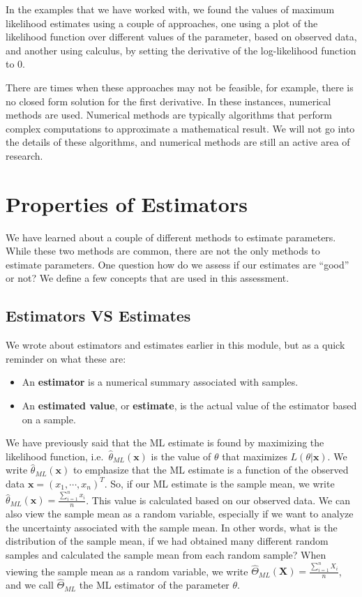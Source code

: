 \documentclass[
]{book}
\begin{document}
In the examples that we have worked with, we found the values of maximum likelihood estimates using a couple of approaches, one using a plot of the likelihood function over different values of the parameter, based on observed data, and another using calculus, by setting the derivative of the log-likelihood function to 0.

There are times when these approaches may not be feasible, for example, there is no closed form solution for the first derivative. In these instances, numerical methods are used. Numerical methods are typically algorithms that perform complex computations to approximate a mathematical result. We will not go into the details of these algorithms, and numerical methods are still an active area of research.

\section{Properties of Estimators}\label{estprops}

We have learned about a couple of different methods to estimate parameters. While these two methods are common, there are not the only methods to estimate parameters. One question how do we assess if our estimates are ``good'' or not? We define a few concepts that are used in this assessment.

\subsection{Estimators VS Estimates}\label{estimators-vs-estimates}

We wrote about estimators and estimates earlier in this module, but as a quick reminder on what these are:

\begin{itemize}
\item
  An \textbf{estimator} is a numerical summary associated with samples.
\item
  An \textbf{estimated value}, or \textbf{estimate}, is the actual value of the estimator based on a sample.
\end{itemize}

We have previously said that the ML estimate is found by maximizing the likelihood function, i.e.~\(\hat{\theta}_{ML}(\boldsymbol{x})\) is the value of \(\theta\) that maximizes \(L(\theta| \boldsymbol{x})\). We write \(\hat{\theta}_{ML}(\boldsymbol{x})\) to emphasize that the ML estimate is a function of the observed data \(\boldsymbol{x} = (x_1,\cdots, x_n)^T\). So, if our ML estimate is the sample mean, we write \(\hat{\theta}_{ML}(\boldsymbol{x}) = \frac{\sum_{i=1}^n x_i}{n}\). This value is calculated based on our observed data.
We can also view the sample mean as a random variable, especially if we want to analyze the uncertainty associated with the sample mean. In other words, what is the distribution of the sample mean, if we had obtained many different random samples and calculated the sample mean from each random sample? When viewing the sample mean as a random variable, we write \(\hat{\Theta}_{ML}(\boldsymbol{X}) = \frac{\sum_{i=1}^n X_i}{n}\), and we call \(\hat{\Theta}_{ML}\) the ML estimator of the parameter \(\theta\).
\end{document}
